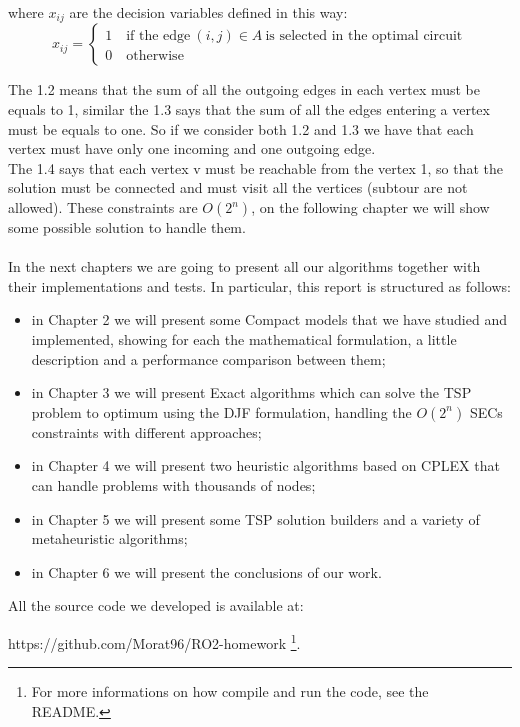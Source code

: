 where $x_{ij}$ are the decision variables defined in this way:
\[ x_{ij} =
	\begin{cases}
		1 \quad \text{if the edge} \ (i,j) \in A \ \text{is selected in the optimal circuit} \\
		0 \quad \text{otherwise}
	\end{cases}
\]

\noindent The 1.2 means that the sum of all the outgoing edges in each vertex must be equals to 1, similar the 1.3 says that the sum of all the edges entering a vertex must be equals to one. So if we consider both 1.2 and 1.3 we have that each vertex must have only one incoming and one outgoing edge. \\ The 1.4 says that each vertex v must be reachable from the vertex 1, so that the solution must be connected and must visit all the vertices (subtour are not allowed). These constraints are $O(2^n)$, on the following chapter we will show some possible solution to handle them.
\\\\
In the next chapters we are going to present all our algorithms together with their implementations and tests. In particular, this report is structured as follows:

\begin{itemize}
  \item in Chapter 2 we will present some Compact models that we have studied and implemented, showing for each the mathematical formulation, a little description and a performance comparison between them;
  \item in Chapter 3 we will present Exact algorithms which can solve the TSP problem to optimum using the DJF formulation, handling the $O(2^n)$ SECs constraints with different approaches;
    \item in Chapter 4 we will present two heuristic algorithms based on CPLEX that can handle problems with thousands of nodes;
    \item in Chapter 5 we will present some TSP solution builders and a variety of metaheuristic algorithms;
     \item in Chapter 6 we will present the conclusions of our work.
\end{itemize}

All the source code we developed is available at:
\begin{center}
https://github.com/Morat96/RO2-homework \footnote{For more informations on how compile and run the code, see the README.}. 

\end{center}

